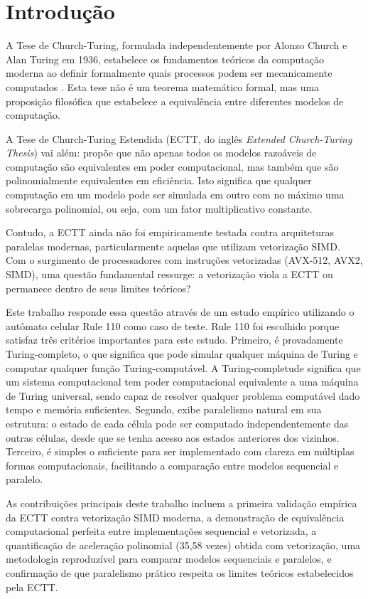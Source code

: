 \documentclass[12pt]{article}
\begin{document}
\section{Introdução}\label{sec:intro}

A Tese de Church-Turing, formulada independentemente por Alonzo Church e Alan Turing em 1936, estabelece os fundamentos teóricos da computação moderna ao definir formalmente quais processos podem ser mecanicamente computados \cite{turing1936, church1936}. Esta tese não é um teorema matemático formal, mas uma proposição filosófica que estabelece a equivalência entre diferentes modelos de computação.

A Tese de Church-Turing Estendida (ECTT, do inglês \textit{Extended Church-Turing Thesis}) vai além: propõe que não apenas todos os modelos razoáveis de computação são equivalentes em poder computacional, mas também que são polinomialmente equivalentes em eficiência. Isto significa que qualquer computação em um modelo pode ser simulada em outro com no máximo uma sobrecarga polinomial, ou seja, com um fator multiplicativo constante.

Contudo, a ECTT ainda não foi empiricamente testada contra arquiteturas paralelas modernas, particularmente aquelas que utilizam vetorização SIMD. Com o surgimento de processadores com instruções vetorizadas (AVX-512, AVX2, SIMD), uma questão fundamental ressurge: a vetorização viola a ECTT ou permanece dentro de seus limites teóricos?

Este trabalho responde essa questão através de um estudo empírico utilizando o autômato celular Rule 110 como caso de teste. Rule 110 foi escolhido porque satisfaz três critérios importantes para este estudo. Primeiro, é provadamente Turing-completo, o que significa que pode simular qualquer máquina de Turing e computar qualquer função Turing-computável. A Turing-completude significa que um sistema computacional tem poder computacional equivalente a uma máquina de Turing universal, sendo capaz de resolver qualquer problema computável dado tempo e memória suficientes. Segundo, exibe paralelismo natural em sua estrutura: o estado de cada célula pode ser computado independentemente das outras células, desde que se tenha acesso aos estados anteriores dos vizinhos. Terceiro, é simples o suficiente para ser implementado com clareza em múltiplas formas computacionais, facilitando a comparação entre modelos sequencial e paralelo.

As contribuições principais deste trabalho incluem a primeira validação empírica da ECTT contra vetorização SIMD moderna, a demonstração de equivalência computacional perfeita entre implementações sequencial e vetorizada, a quantificação de aceleração polinomial (35,58 vezes) obtida com vetorização, uma metodologia reproduzível para comparar modelos sequenciais e paralelos, e confirmação de que paralelismo prático respeita os limites teóricos estabelecidos pela ECTT.
\end{document}
